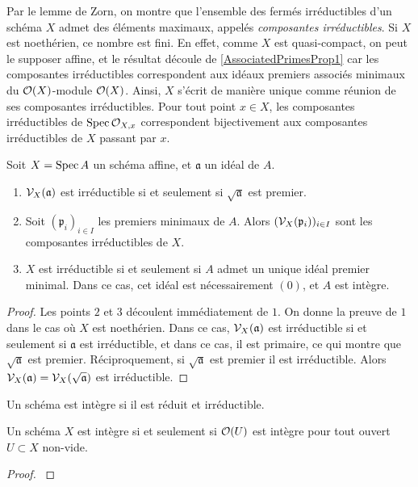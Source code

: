 Par le lemme de Zorn, on montre que l'ensemble des fermés irréductibles d'un schéma $X$ admet des éléments maximaux, appelés \textit{composantes irréductibles}. Si $X$ est noethérien, ce nombre est fini. En effet, comme $X$ est quasi-compact, on peut le supposer affine, et le résultat découle de \ref{AssociatedPrimesProp1} car les composantes irréductibles correspondent aux idéaux premiers associés minimaux du $\mathcal{O}(X)$-module $\mathcal{O}(X)$. Ainsi, $X$ s'écrit de manière unique comme réunion de ses composantes irréductibles. Pour tout point $x\in X$, les composantes irréductibles de $\operatorname{Spec} \mathcal{O}_{X,x}$ correspondent bijectivement aux composantes irréductibles de $X$ passant par $x$.

\begin{prop}
Soit $X=\operatorname{Spec} A$ un schéma affine, et $\mathfrak{a}$ un idéal de $A$.
\begin{enumerate}
\item $\mathcal{V}_X(\mathfrak{a})$ est irréductible si et seulement si $\sqrt{\mathfrak{a}}$ est premier.
\item Soit $(\mathfrak{p}_i)_{i\in I}$ les premiers minimaux de $A$. Alors $(\mathcal{V}_X(\mathfrak{p}_i))_{i\in I}$ sont les composantes irréductibles de $X$.
\item $X$ est irréductible si et seulement si $A$ admet un unique idéal premier minimal. Dans ce cas, cet idéal est nécessairement $(0)$, et $A$ est intègre.
\end{enumerate}
\end{prop}
\begin{proof}
Les points $2$ et $3$ découlent immédiatement de $1$. On donne la preuve de $1$ dans le cas où $X$ est noethérien. Dans ce cas, $\mathcal{V}_X(\mathfrak{a})$ est irréductible si et seulement si $\mathfrak{a}$ est irréductible, et dans ce cas, il est primaire, ce qui montre que $\sqrt{\mathfrak{a}}$ est premier. Réciproquement, si $\sqrt{\mathfrak{a}}$ est premier il est irréductible. Alors $\mathcal{V}_X(\mathfrak{a})=\mathcal{V}_X(\sqrt{\mathfrak{a}})$ est irréductible.
\end{proof}

\begin{defn}
Un schéma est intègre si il est réduit et irréductible.
\end{defn}

\begin{prop}\label{SchemaIntegreCritere}
Un schéma $X$ est intègre si et seulement si $\mathcal{O}(U)$ est intègre pour tout ouvert $U\subset X$ non-vide.
\end{prop}
\begin{proof}
\cite[II.3.1]{Hartshorne}
\end{proof}


